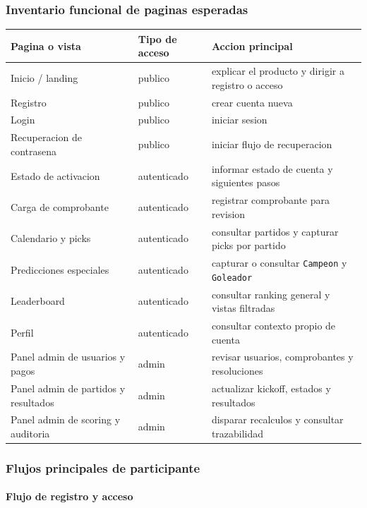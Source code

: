 \subsubsection{Inventario funcional de paginas esperadas}

\begin{longtable}{p{}p{}p{}}
\toprule
\textbf{Pagina o vista} & \textbf{Tipo de acceso} & \textbf{Accion principal} \\
\midrule
Inicio / landing & publico & explicar el producto y dirigir a registro o acceso \\
Registro & publico & crear cuenta nueva \\
Login & publico & iniciar sesion \\
Recuperacion de contrasena & publico & iniciar flujo de recuperacion \\
Estado de activacion & autenticado & informar estado de cuenta y siguientes pasos \\
Carga de comprobante & autenticado & registrar comprobante para revision \\
Calendario y picks & autenticado & consultar partidos y capturar picks por partido \\
Predicciones especiales & autenticado & capturar o consultar \texttt{Campeon} y \texttt{Goleador} \\
Leaderboard & autenticado & consultar ranking general y vistas filtradas \\
Perfil & autenticado & consultar contexto propio de cuenta \\
Panel admin de usuarios y pagos & admin & revisar usuarios, comprobantes y resoluciones \\
Panel admin de partidos y resultados & admin & actualizar kickoff, estados y resultados \\
Panel admin de scoring y auditoria & admin & disparar recalculos y consultar trazabilidad \\
\bottomrule
\end{longtable}

\subsubsection{Flujos principales de participante}

\paragraph{Flujo de registro y acceso}

